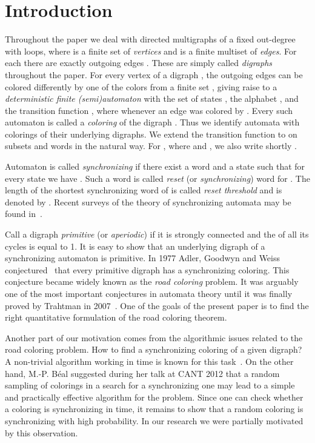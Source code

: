 \documentclass[runningheads]{llncs}
\begin{document}
\section{Introduction}

Throughout the paper we deal with directed multigraphs  of a fixed out-degree  with loops, where  is a finite set of  \emph{vertices} and  is a finite multiset of \emph{edges}. For each  there are exactly  outgoing edges . These are simply called \emph{digraphs} throughout the paper.
For every vertex  of a digraph , the  outgoing edges can be colored differently by one of the  colors from a finite set , giving raise to a \emph{deterministic finite (semi)automaton}  with the set of states , the alphabet , and the transition function , where  whenever an edge  was colored by . Every such automaton  is called a \emph{coloring} of the digraph .
Thus we identify automata with colorings of their underlying digraphs.
We extend the transition function  to  on subsets and words in the natural way.
For , where  and , we also write shortly .

Automaton  is called \emph{synchronizing}
if there exist a word  and a state  such that for every state  we have . Such a word  is called \emph{reset} (or \emph{synchronizing}) word for .
The length of the shortest synchronizing word of  is called \emph{reset threshold} and is denoted by .
Recent surveys of the theory of synchronizing automata may be found in~\cite{KariVolkov2013Handbook,Volkov2008Survey}.

Call a digraph \emph{primitive} (or \emph{aperiodic}) if it is strongly connected and the  of all its cycles is equal to 1.
It is easy to show that an underlying digraph of a synchronizing automaton is primitive. In 1977 Adler, Goodwyn and Weiss conjectured~\cite{AGW1977} that every primitive digraph has a synchronizing coloring. This conjecture became widely known as the \emph{road coloring} problem. It was arguably one of the most important conjectures in automata theory until it was finally proved by Trahtman in 2007~\cite{Tr2009RoadColoring}. One of the goals of the present paper is to find the right quantitative formulation of the road coloring theorem. 

Another part of our motivation comes from the algorithmic issues related to the road coloring problem. How to find a synchronizing coloring of a given digraph?
A non-trivial algorithm working in time  is known for this task~\cite{BealPerrin2014AQuadraticAlgorithmForRoadColoring}. On the other hand, M.-P. B{\'e}al suggested during her talk at CANT 2012 that a random sampling of colorings in a search for a synchronizing one may lead to a simple and practically effective algorithm for the problem. Since one can check whether a coloring is synchronizing in  time, it remains to show that a random coloring is synchronizing with high probability. In our research we were partially motivated by this observation.
\end{document}
